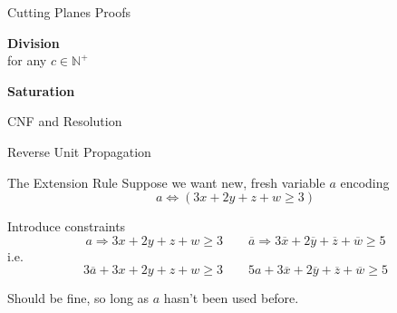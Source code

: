 \documentclass[aspectratio=169,compress,10pt]{beamer}
\begin{document}
\begin{frame}{Cutting Planes Proofs}
    \begin{minipage}[c]{0.35\framewidth}
        \textcolor{uofgcobalt}{\textbf{Division}}\\
        for any $c \in \mathbb{N^+}$
    \end{minipage}\hfill\begin{minipage}[c]{0.60\framewidth}\begin{prooftree}
    \end{prooftree}\end{minipage}\medskip

    \begin{minipage}[c]{0.35\framewidth}
        \textcolor{uofgcobalt}{\textbf{Saturation}}
    \end{minipage}\hfill\begin{minipage}[c]{0.60\framewidth}\begin{prooftree}
    \end{prooftree}\end{minipage}
\end{frame}

\begin{frame}{CNF and Resolution}
\end{frame}

\begin{frame}{Reverse Unit Propagation}
\end{frame}

\begin{frame}{The Extension Rule}
  Suppose we want new, fresh variable
  $a$ encoding
  \begin{equation*}
        a
        \Leftrightarrow
        ( 3x + 2y + z + w \ge 3 )
  \end{equation*}

  Introduce constraints
    \begin{equation*}
    a \Rightarrow 3x + 2y + z + w \ge 3
    \qquad
        \overline{a} \Rightarrow
    3 \overline{x} + 2 \overline{y}  + \overline{z} + \overline{w} \ge 5
    \end{equation*}
    i.e.
  \begin{equation*}
    3 \overline{a} + 3x + 2y + z + w \ge 3
    \qquad
    5 a +
    3 \overline{x} + 2 \overline{y}  + \overline{z} + \overline{w} \ge 5
  \end{equation*}

  Should be fine, so long as $a$ hasn't been used before.
\end{frame}
\end{document}
